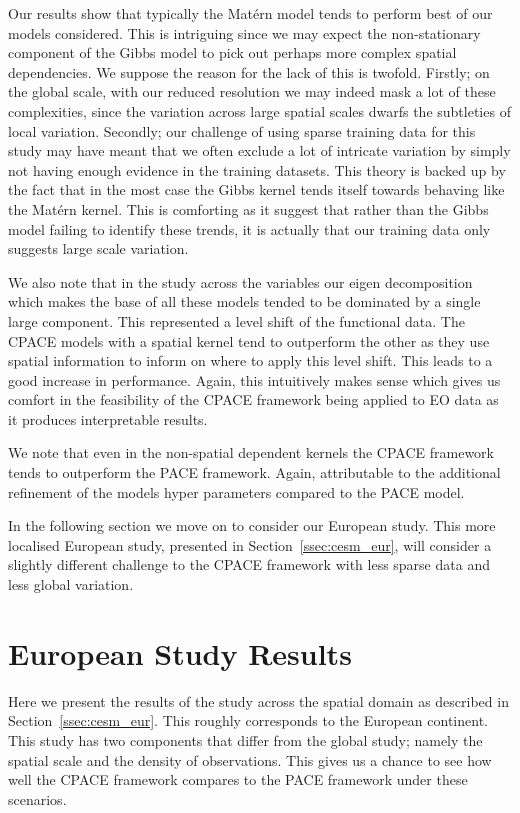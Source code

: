 Our results show that typically the Mat\'ern model tends to perform best of our models considered.
This is intriguing since we may expect the non-stationary component of the Gibbs model to pick out perhaps more complex spatial dependencies.
We suppose the reason for the lack of this is twofold.
Firstly; on the global scale, with our reduced resolution we may indeed mask a lot of these complexities, since the variation across large spatial scales dwarfs the subtleties of local variation.
Secondly; our challenge of using sparse training data for this study may have meant that we often exclude a lot of intricate variation by simply not having enough evidence in the training datasets. 
This theory is backed up by the fact that in the most case the Gibbs kernel tends itself towards behaving like the Mat\'ern kernel.
This is comforting as it suggest that rather than the Gibbs model failing to identify these trends, it is actually that our training data only suggests large scale variation.

We also note that in the study across the variables our eigen decomposition which makes the base of all these models tended to be dominated by a single large component.
This represented a level shift of the functional data.
The CPACE models with a spatial kernel tend to outperform the other as they use spatial information to inform on where to apply this level shift.
This leads to a good increase in performance.
Again, this intuitively makes sense which gives us comfort in the feasibility of the CPACE framework being applied to EO data as it produces interpretable results.

We note that even in the non-spatial dependent kernels the CPACE framework tends to outperform the PACE framework.
Again, attributable to the additional refinement of the models hyper parameters compared to the PACE model.

In the following section we move on to consider our European study. 
This more localised European study, presented in Section~\ref{ssec:cesm_eur}, will consider a slightly different challenge to the CPACE framework with less sparse data and less global variation.

\section{European Study Results \label{sec:cesm_res_eurr}}
Here we present the results of the study across the spatial domain as described in Section~\ref{ssec:cesm_eur}.
This roughly corresponds to the European continent.
This study has two components that differ from the global study; namely the spatial scale and the density of observations.
This gives us a chance to see how well the CPACE framework compares to the PACE framework under these scenarios.

